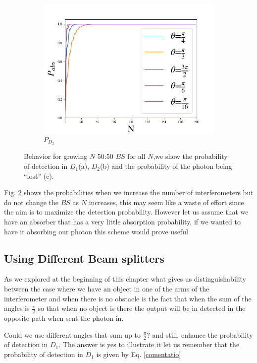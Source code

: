 \documentclass{book}
\begin{document}
\begin{figure}[!t]
\begin{subfigure}[b]{0.45\linewidth}
\includegraphics[width=\linewidth]{images/BsFijo_azumaabs.png}
\caption{$P_{D_{2}}$}
\label{fig:BS1}
\end{subfigure}
\caption{Behavior for growing $N$ 50:50 $BS$ for all $N$,we show the probability of detection in $D_{1}$(a), $D_{2}$(b) and the probability of the photon being ``lost'' (c).}
\label{Azuma2}
\end{figure}
 
 Fig. \ref{Azuma2} shows the probabilities when we increase the number of interferometers but do not change the $BS$ as $N$ increases, this may seem like a waste of effort since the aim is to maximize the detection probability. However let us assume that we have an absorber that has a very little absorption probability, if we wanted to have it absorbing our photon this scheme would prove useful

\subsection{Using Different Beam splitters}

As we explored at the beginning of this chapter what gives us distinguishability between the case where we have an object in one of the arms of the interferometer and when there is no obstacle is the fact that when the sum of the angles is $\frac{ \pi}{2}$ so that when no object is there the output will be in detected in the opposite path when sent the photon in.

Could we use different angles that sum up to $\frac{\pi}{2}$? and still, enhance the probability of detection in $D_{1}$. The answer is yes to illustrate it let us remember that the probability of detection in $D_{1}$ is given by Eq. \ref{comentatio}
\end{document}
